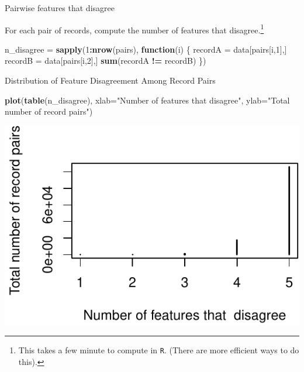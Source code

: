 \documentclass[
  ignorenonframetext,
]{beamer}
\newenvironment{Shaded}{\begin{snugshade}}{\end{snugshade}}
\newcommand{\ControlFlowTok}[1]{\textcolor[rgb]{0.13,0.29,0.53}{\textbf{#1}}}
\newcommand{\DataTypeTok}[1]{\textcolor[rgb]{0.13,0.29,0.53}{#1}}
\newcommand{\DecValTok}[1]{\textcolor[rgb]{0.00,0.00,0.81}{#1}}
\newcommand{\KeywordTok}[1]{\textcolor[rgb]{0.13,0.29,0.53}{\textbf{#1}}}
\newcommand{\NormalTok}[1]{#1}
\newcommand{\OperatorTok}[1]{\textcolor[rgb]{0.81,0.36,0.00}{\textbf{#1}}}
\newcommand{\StringTok}[1]{\textcolor[rgb]{0.31,0.60,0.02}{#1}}
\begin{document}
\begin{frame}[fragile]{Pairwise features that disagree}
\protect\hypertarget{pairwise-features-that-disagree}{}

For each pair of records, compute the number of features that
disagree.\footnote{This takes a few minute to compute in \texttt{R}. (There are more efficient ways to do this).}

\begin{Shaded}
\begin{Highlighting}[]
\NormalTok{n_disagree =}\StringTok{ }\KeywordTok{sapply}\NormalTok{(}\DecValTok{1}\OperatorTok{:}\KeywordTok{nrow}\NormalTok{(pairs), }\ControlFlowTok{function}\NormalTok{(i) \{}
\NormalTok{  recordA =}\StringTok{ }\NormalTok{data[pairs[i,}\DecValTok{1}\NormalTok{],]}
\NormalTok{  recordB =}\StringTok{ }\NormalTok{data[pairs[i,}\DecValTok{2}\NormalTok{],]}
  \KeywordTok{sum}\NormalTok{(recordA }\OperatorTok{!=}\StringTok{ }\NormalTok{recordB)}
\NormalTok{\})}
\end{Highlighting}
\end{Shaded}

\end{frame}

\begin{frame}[fragile]{Distribution of Feature Disagreement Among Record
Pairs}
\protect\hypertarget{distribution-of-feature-disagreement-among-record-pairs}{}

\footnotesize

\begin{Shaded}
\begin{Highlighting}[]
\KeywordTok{plot}\NormalTok{(}\KeywordTok{table}\NormalTok{(n_disagree), }
     \DataTypeTok{xlab=}\StringTok{"Number of features that  disagree"}\NormalTok{,}
     \DataTypeTok{ylab=}\StringTok{"Total number of record pairs"}\NormalTok{)}
\end{Highlighting}
\end{Shaded}

\begin{center}\includegraphics{pipeline-approaches_files/figure-beamer/unnamed-chunk-5-1} \end{center}

\end{frame}
\end{document}
